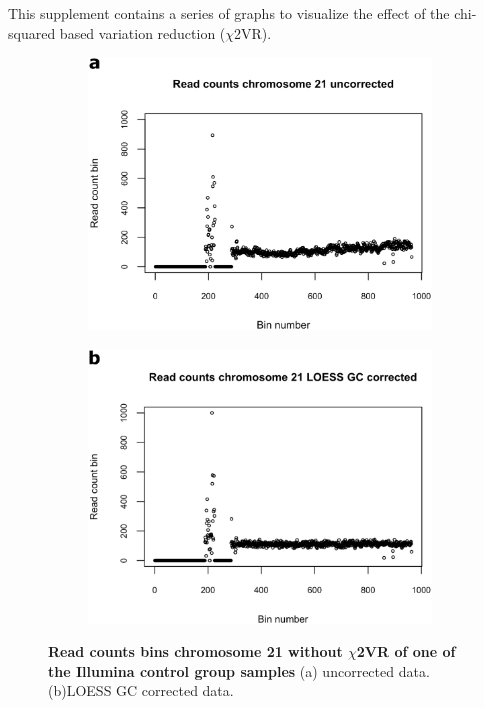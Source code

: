 This supplement contains a series of graphs to visualize the effect of the chi-squared based variation reduction ($\chi$2VR). 


\begin{figure}[h]
	\begin{subfigure}{.5\textwidth}
		\centering
		\includegraphics[width=1\linewidth]{img/NIPT_Supp1_Fig1_1a}
		\label{fig:NIPT_Supp1_Fig1_1a}
	\end{subfigure}%
	\begin{subfigure}{.5\textwidth}
		\centering
		\includegraphics[width=1\linewidth]{img/NIPT_Supp1_Fig1_1b}
		\label{fig:NIPT_Supp1_Fig1_1b}
	\end{subfigure} 
	\caption[Example effect $\chi$2VR on bin counts]{\textbf{Read counts bins chromosome 21 without $\chi$2VR of one of the Illumina control group samples} (a) uncorrected data. (b)LOESS GC corrected data.}
	\label{fig:NIPT_Supp1_Fig1_1}
\end{figure}

